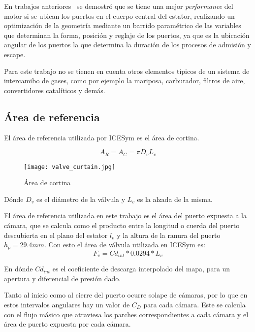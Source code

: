 En trabajos anteriores~\cite{lopez13} se demostró que se tiene una mejor
\emph{performance} del motor si se ubican los puertos en el cuerpo central del
estator, realizando un optimización de la geometría mediante un barrido
paramétrico de las variables que determinan la forma, posición y reglaje de los
puertos, ya que es la ubicación angular de los puertos la que determina la
duración de los procesos de admisión y escape.

Para este trabajo no se tienen en cuenta otros elementos típicos de un sistema
de intercamibo de gases, como por ejemplo la mariposa, carburador, filtros de
aire, convertidores catalíticos y demás.

\subsection{Área de referencia}
%
El área de referencia utilizada por ICESym es el área de cortina.

\begin{equation}
  \label{eq:Ar}
  A_R = A_C = \pi D_v L_v
\end{equation}

\begin{figure}
  \centering
  \texttt{[image: valve\_curtain.jpg]}
  \caption{Área de cortina}\label{fig:area_cortina}
\end{figure}

Dónde $D_v$ es el diámetro de la válvula y $L_v$ es la alzada de la misma.

El área de referencia utilizada en este trabajo es el área del puerto expuesta a
la cámara, que se calcula como el producto entre la longitud o cuerda del puerto
descubierta en el plano del estator $l_v$ y la altura de la ranura del puerto
$h_p=29.4mm$.
%
Con esto el área de válvula utilizada en ICESym es:
\begin{equation}
  \label{eq:fv}
  F_v = Cd_{int}*0.0294*L_v
\end{equation}

En dónde $Cd_{int}$ es el coeficiente de descarga interpolado del mapa, para un apertura
y diferencial de presión dado.


%
Tanto al inicio como al cierre del puerto ocurre solape de cámaras, por lo que
en estos intervalos angulares hay un valor de $C_D$ para cada cámara.
%
Este se calcula con el flujo másico que atraviesa los parches correspondientes
a cada cámara y el área de puerto expuesta por cada cámara.

